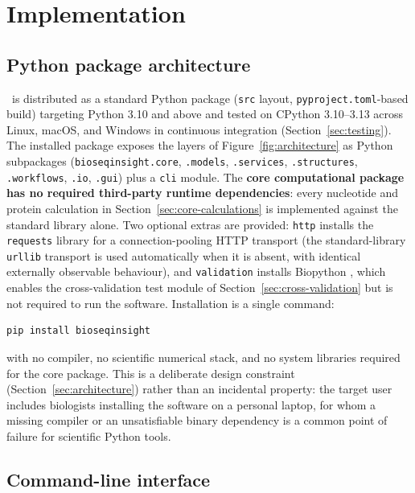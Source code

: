 \section{Implementation}
\label{sec:implementation}

\subsection{Python package architecture}
\label{sec:package-architecture}

\bsi\ is distributed as a standard Python package (\texttt{src} layout,
\texttt{pyproject.toml}-based build) targeting Python 3.10 and above and
tested on CPython 3.10--3.13 across Linux, macOS, and Windows in continuous
integration (Section~\ref{sec:testing}). The installed package exposes the
layers of Figure~\ref{fig:architecture} as Python subpackages
(\texttt{bioseqinsight.core}, \texttt{.models}, \texttt{.services},
\texttt{.structures}, \texttt{.workflows}, \texttt{.io}, \texttt{.gui}) plus
a \texttt{cli} module. The \textbf{core computational package has no
required third-party runtime dependencies}: every nucleotide and protein
calculation in Section~\ref{sec:core-calculations} is implemented against
the standard library alone. Two optional extras are provided: \texttt{http}
installs the \texttt{requests} library for a connection-pooling HTTP
transport (the standard-library \texttt{urllib} transport is used
automatically when it is absent, with identical externally observable
behaviour), and \texttt{validation} installs Biopython
\citep{cock2009biopython}, which enables the cross-validation test module of
Section~\ref{sec:cross-validation} but is not required to run the software.
Installation is a single command:

\begin{lstlisting}
pip install bioseqinsight
\end{lstlisting}

with no compiler, no scientific numerical stack, and no system libraries
required for the core package. This is a deliberate design constraint
(Section~\ref{sec:architecture}) rather than an incidental property: the
target user includes biologists installing the software on a personal
laptop, for whom a missing compiler or an unsatisfiable binary dependency is
a common point of failure for scientific Python tools.

\subsection{Command-line interface}
\label{sec:cli}

